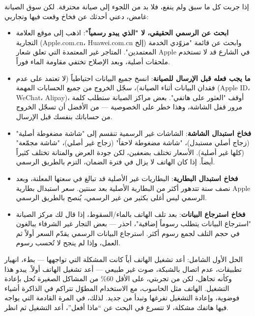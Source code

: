 
إذا جربت كل ما سبق ولم ينفع، فلا بد من اللجوء إلى صيانة محترفة. لكن سوق الصيانة غامض، دعني أحدثك عن فخاخ وقعت فيها وتجاربي:

\begin{itemize}
  \item \textbf{ابحث عن الرسمي الحقيقي، لا "الذي يبدو رسمياً"}: اذهب إلى موقع العلامة التجارية (Apple.com.cn، Huawei.com.cn إلخ) وابحث عن قائمة "مزوّدي الخدمة المعتمدين". المتاجر غير المعتمدة التي تعلق شعار Apple في الشارع قد لا تستخدم ملحقات أصلية، وبعد الإصلاح تختفي مقاومة الماء فوراً.
  \item \textbf{ما يجب فعله قبل الإرسال للصيانة}: انسخ جميع البيانات احتياطياً (لا تعتمد على عدم فقدان البيانات أثناء الصيانة)، سجّل الخروج من جميع الحسابات المهمة (Apple ID، WeChat، Alipay)، أوقف "العثور على هاتفي". بعض مراكز الصيانة ستطلب كلمة مرور قفل الشاشة، وهذا خطر على الخصوصية — من الأفضل أن تسجّل الخروج من حساباتك بنفسك قبل الإرسال.
  \item \textbf{فخاخ استبدال الشاشة}: الشاشات غير الرسمية تنقسم إلى "شاشة مضغوطة أصلية" (زجاج أصلي مستبدل)، "شاشة مضغوطة لاحقاً" (زجاج غير أصلي)، "شاشة مجمّعة" (كلها غير أصلية). الأسعار تختلف بضعفين، لكن جودة العرض والمتانة تختلف كثيراً أيضاً. إذا كان الهاتف لا يزال في فترة الضمان، التزم بالطريق الرسمي.
  \item \textbf{فخاخ استبدال البطارية}: البطاريات غير الأصلية قد تبالغ في سعتها المعلنة، وبعد نصف سنة تتدهور أكثر من البطارية الأصلية بعد سنتين. سعر استبدال بطارية Apple الرسمي ليس أغلى بكثير من غير الرسمي، يُنصح بالطريق الرسمي.
  \item \textbf{فخاخ استرجاع البيانات}: بعد تلف الهاتف بالماء/السقوط، إذا قال لك مركز الصيانة "استرجاع البيانات يتطلب رسوماً إضافية"، احذر — بعض التجار غير الشرفاء يبالغون في حجم التلف لجمع رسوم أكثر. استرجاع البيانات الرسمي يقدّم السعر أولاً ثم العمل، وإذا لم ينجح لا تُحسب رسوم.
\end{itemize}

\begin{tcbwarn}{الحل الأول الشامل: أعد تشغيل الهاتف}
أياً كانت المشكلة التي تواجهها — بطء، انهيار تطبيقات، عدم اتصال بالشبكة، صوت غير طبيعي — أعد تشغيل الهاتف أولاً. يبدو هذا وكأنه تجاهل، لكن من تجربتي، على الأقل 60\% من المشاكل الصغيرة تُحل بإعادة التشغيل. الهاتف مثل الحاسوب، مع الاستخدام المطوّل تتراكم في الذاكرة أشياء فوضوية، وإعادة التشغيل تفرغها وتبدأ من جديد. لذلك، في المرة القادمة التي يواجه فيها هاتفك مشكلة، لا تتسرع في البحث عن “ماذا أفعل”، أعد التشغيل ثم انظر.

\end{tcbwarn}

